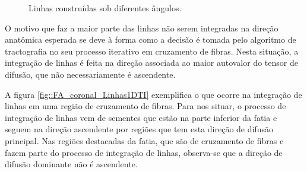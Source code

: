 \documentclass[
    12pt,                %
    oneside,            %
    a4paper,            %
    english,            %
    french,                %
    spanish,            %
    brazil                %
    ]{abntex2}
\begin{document}
\begin{figure}[ht]
\captionsetup[subfloat]{farskip=0pt,nearskip=0pt}
    \hfill
    \hfill
     \caption{Linhas construídas sob diferentes ângulos.} %
    \label{fig::trato}
\end{figure}

O motivo que faz a maior parte das linhas não serem integradas na direção anatômica esperada se deve à forma como a decisão é tomada pelo algoritmo de tractografia no seu processo iterativo em cruzamento de fibras. Nesta situação, a integração de linhas é feita na direção associada ao maior autovalor do tensor de difusão, que não necessariamente é ascendente.

A figura \ref{fig::FA_coronal_Linhas1DTI} exemplifica o que ocorre na integração de linhas em uma região de cruzamento de fibras. Para nos situar, o processo de integração de linhas vem de sementes que estão na parte inferior da fatia e seguem na direção ascendente por regiões que tem esta direção de difusão principal. Nas regiões destacadas da fatia, que são de cruzamento de fibras e fazem parte do processo de integração de linhas, observa-se que a direção de difusão dominante não é ascendente.
\end{document}
